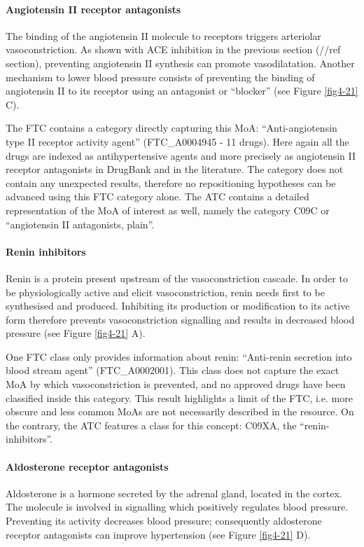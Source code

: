 \paragraph{\textbf{Angiotensin II receptor antagonists}\\}
The binding of the angiotensin II molecule to receptors triggers arteriolar vasoconstriction. As shown with ACE inhibition in the previous section (//ref section), preventing angiotensin II synthesis can promote vasodilatation. Another mechanism to lower blood pressure consists of preventing the binding of angiotensin II to its receptor using an antagonist or “blocker” (see Figure \ref{fig4-21} C).

The FTC contains a category directly capturing this MoA: “Anti-angiotensin type II receptor activity agent” (FTC\_A0004945 - 11 drugs). Here again all the drugs are indexed as antihypertensive agents and more precisely as angiotensin II receptor antagonists in DrugBank and in the literature. The category does not contain any unexpected results, therefore no repositioning hypotheses can be advanced using this FTC category alone. The ATC contains a detailed representation of the MoA of interest as well, namely the category C09C or “angiotensin II antagonists, plain”.

\paragraph{\textbf{Renin inhibitors}\\}
Renin is a protein present upstream of the vasoconstriction cascade. In order to be physiologically active and elicit vasoconstriction, renin needs first to be synthesised and produced. Inhibiting its production or modification to its active form therefore prevents vasoconstriction signalling and results in decreased blood pressure (see Figure \ref{fig4-21} A).

One FTC class only provides information about renin: “Anti-renin secretion into blood stream agent” (FTC\_A0002001). This class does not capture the exact MoA by which vasoconstriction is prevented, and no approved drugs have been classified inside this category. This result highlights a limit of the FTC, i.e. more obscure and less common MoAs are not necessarily described in the resource. On the contrary, the ATC features a class for this concept: C09XA, the “renin-inhibitors”.

\paragraph{\textbf{Aldosterone receptor antagonists}\\}
Aldosterone is a hormone secreted by the adrenal gland, located in the cortex. The molecule is involved in signalling which positively regulates blood pressure. Preventing its activity decreases blood pressure; consequently aldosterone receptor antagonists can improve hypertension (see Figure \ref{fig4-21} D).

